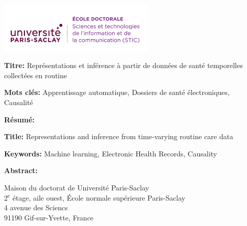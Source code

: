 \documentclass[french,12pt,twoside,a4paper]{book}
\begin{document}
\clearpage
%
%
%
\begin{multicols}{2}
  \printbibliography
\end{multicols}


\ifthispageodd{\newpage\thispagestyle{empty}\null\newpage}{}
\thispagestyle{empty}
\selectfont

\lhead{}
\rhead{}
\rfoot{}
\cfoot{}
\lfoot{}

\noindent
\includegraphics[height=2.45cm]{img/EOBE}
\vspace{1cm}
\selectfont

\small

\begin{mdframed}[linecolor=Prune,linewidth=1]

  \textbf{Titre:} Représentations et inférence à partir de données de santé temporelles collectées en routine


  \noindent \textbf{Mots clés:} Apprentissage automatique, Dossiers de santé
  électroniques, Causalité

  \vspace{-.5cm}
  \begin{multicols}{2}
    \noindent \textbf{Résumé:}
  \end{multicols}

\end{mdframed}

\begin{mdframed}[linecolor=Prune,linewidth=1]

  \textbf{Title:} Representations and inference from time-varying routine care data

  \noindent \textbf{Keywords:} Machine learning, Electronic Health Records, Causality

  \begin{multicols}{2}
    \noindent \textbf{Abstract:}
  \end{multicols}
\end{mdframed}

\vspace{\fill} %

\noindent
\color{Prune} \footnotesize Maison du doctorat de Université Paris-Saclay\\
2$^{\mathrm{e}}$ étage, aile ouest, École normale supérieure Paris-Saclay\\
4 avenue des Sciencs\\
91190 Gif-sur-Yvette, France
\end{document}
